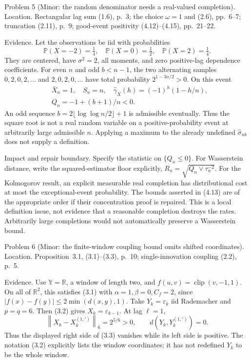 \documentclass[10pt]{article}
\begin{document}
Problem 5 (Minor: the random denominator needs a real-valued completion).  Location. Rectangular lag sum (1.6), p. 3; the choice \(\omega=1\) and (2.6), pp. 6–7; truncation (2.11), p. 9; good-event positivity (4.12)–(4.15), pp. 21–22.\par
Evidence. Let the observations be iid with probabilities \[\mathbb P(X=-2)=\tfrac14,\quad \mathbb P(X=0)=\tfrac12,\quad \mathbb P(X=2)=\tfrac14.\] They are centered, have \(\sigma^2=2\), all moments, and zero positive-lag dependence coefficients. For even \(n\) and odd \(b<n-1\), the two alternating samples \(0,2,0,2,\ldots\) and \(2,0,2,0,\ldots\) have total probability \(2^{1-3n/2}>0\). On this event \[\begin{aligned}
&\bar X_n=1,\quad S_n=n,\quad
\widehat\gamma_X(h)=(-1)^h(1-h/n),\\
&Q_n=-1+(b+1)/n<0.
\end{aligned}\] An odd sequence \(b=2\lfloor\log\log n/2\rfloor+1\) is admissible eventually. Thus the square root is not a real random variable on a positive-probability event at arbitrarily large admissible \(n\). Applying a maximum to the already undefined \(\widehat\sigma_{nb}\) does not supply a definition.\par
Impact and repair boundary. Specify the statistic on \(\{Q_n\le0\}\). For Wasserstein distance, write the squared-estimator floor explicitly, \(R_n=\sqrt{Q_n\vee\tau_n^{-2}}\). For the Kolmogorov result, an explicit measurable real completion has distributional cost at most the exceptional-event probability. The bounds asserted in (4.13) are of the appropriate order if their concentration proof is repaired. This is a local definition issue, not evidence that a reasonable completion destroys the rates. Arbitrarily large completions would not automatically preserve a Wasserstein bound.\par
Problem 6 (Minor: the finite-window coupling bound omits shifted coordinates).  Location. Proposition 3.1, (3.1)–(3.3), p. 10; single-innovation coupling (2.2), p. 5.\par
Evidence. Use \(\mathbb Y=\mathbb R\), a window of length two, and \(f(u,v)=\operatorname{clip}(v,-1,1)\). On all of \(\mathbb R^2\), this satisfies (3.1) with \(\alpha=1,\beta=0,C_f=2\), since \(|f(x)-f(y)|\le2\min(d(x,y),1)\). Take \(Y_k=\varepsilon_k\) iid Rademacher and \(p=q=6\). Then (3.2) gives \(X_k=\varepsilon_{k-1}\). At lag \(\ell=1\), \[\left\|X_k-X_k^{(1,\prime)}\right\|_6=2^{5/6}>0,\qquad
d(Y_k,Y_k^{(1,\prime)})=0.\] Thus the displayed right side of (3.3) vanishes while its left side is positive. The notation (3.2) explicitly lists the window coordinates; it has not redefined \(Y_k\) to be the whole window.\par
\end{document}
